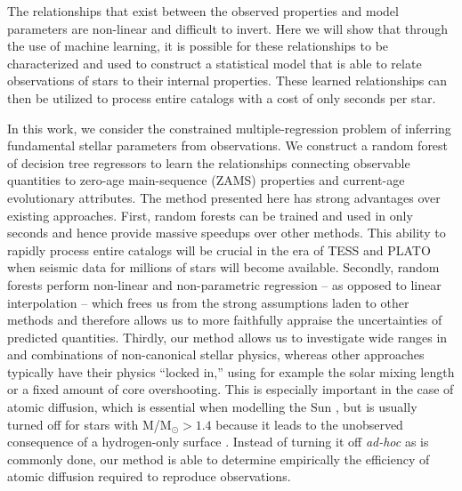 \documentclass[manuscript]{aastex}
\begin{document}
The relationships that exist between the observed properties and model parameters are non-linear and difficult to invert. Here we will show that through the use of machine learning, it is possible for these relationships to be characterized %
and used to construct a statistical model that is able to relate observations of stars to their internal properties. These learned relationships can then be utilized to process entire catalogs with a cost of only seconds per star. 

In this work, we consider the constrained multiple-regression problem of inferring fundamental stellar parameters from observations. We construct a random forest of decision tree regressors to learn the relationships connecting observable quantities to zero-age main-sequence (ZAMS) properties and current-age evolutionary attributes. The method presented here has strong advantages over existing approaches. First, random forests can be trained and used in only seconds and hence provide massive speedups over other methods. This ability to rapidly process entire catalogs will be crucial in the era of TESS \citep{2015JATIS...1a4003R} and PLATO \citep{2014ExA....38..249R} when seismic data for millions of stars will become available. Secondly, random forests perform non-linear and non-parametric regression -- as opposed to linear interpolation -- which frees us from the strong assumptions laden to other methods and therefore allows us to more faithfully appraise the uncertainties of predicted quantities. %
Thirdly, our method allows us to investigate wide ranges in and combinations of non-canonical stellar physics, whereas other approaches typically have their physics ``locked in,'' using for example the solar mixing length or a fixed amount of core overshooting. This is especially important in the case of atomic diffusion, which is essential when modelling the Sun \citep{1994MNRAS.269.1137B}, but is usually turned off for stars with M/M$_\odot > 1.4$ because it leads to the unobserved consequence of a hydrogen-only surface \citep{2002A&A...390..611M}. Instead of turning it off \emph{ad-hoc} as is commonly done, our method is able to determine empirically the efficiency of atomic diffusion required to reproduce observations. %
\end{document}
